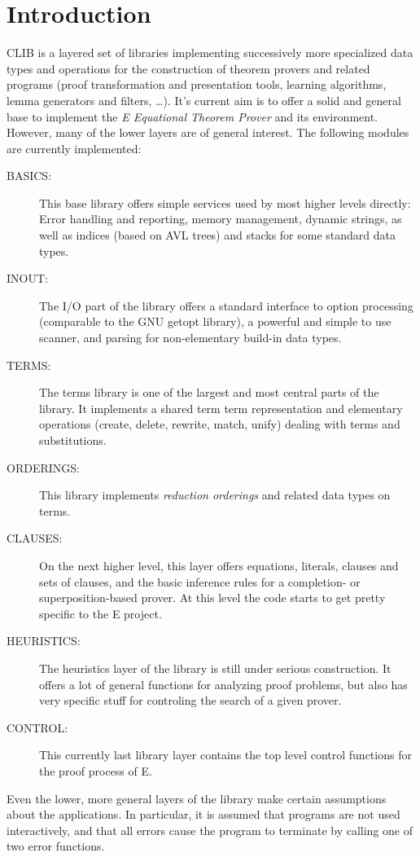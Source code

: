 
\section{Introduction}
\label{sec:intro}

CLIB is a layered set of libraries implementing successively more
specialized data types and operations for the construction of theorem
provers and related programs (proof transformation and presentation
tools, learning algorithms, lemma generators and filters, \ldots).
It's current aim is to offer a solid and general base to implement the
\emph{E Equational Theorem Prover} and its environment. However, many
of the lower layers are of general interest. The following modules are
currently implemented:

\begin{description}
\item[BASICS:] This base library offers simple services used by most
  higher levels directly: Error handling and reporting, memory
  management, dynamic strings, as well as indices (based on AVL trees)
  and stacks for some standard data types.
\item[INOUT:] The I/O part of the library offers a standard interface
  to option processing (comparable to the GNU getopt library), a
  powerful and simple to use scanner, and parsing for non-elementary
  build-in data types. 
\item[TERMS:] The terms library is one of the largest and most central
  parts of the library. It implements a shared term term
  representation and elementary operations (create, delete, rewrite,
  match, unify) dealing with terms and substitutions.
\item[ORDERINGS:] This library implements \emph{reduction orderings}
  and related data types on terms.
\item[CLAUSES:] On the next higher level, this layer offers equations,
  literals, clauses and sets of clauses, and the basic inference rules
  for a completion- or superposition-based prover. At this level the
  code starts to get pretty specific to the E project.
\item[HEURISTICS:] The heuristics layer of the library is still under
  serious construction. It offers a lot of general functions for
  analyzing proof problems, but also has very specific stuff for
  controling the search of a given prover.
\item[CONTROL:] This currently last library layer contains the top
  level control functions for the proof process of E.
\end{description}

Even the lower, more general layers of the library make certain
assumptions about the applications. In particular, it is assumed that
programs are not used interactively, and that all errors cause the
program to terminate by calling one of two error functions.

